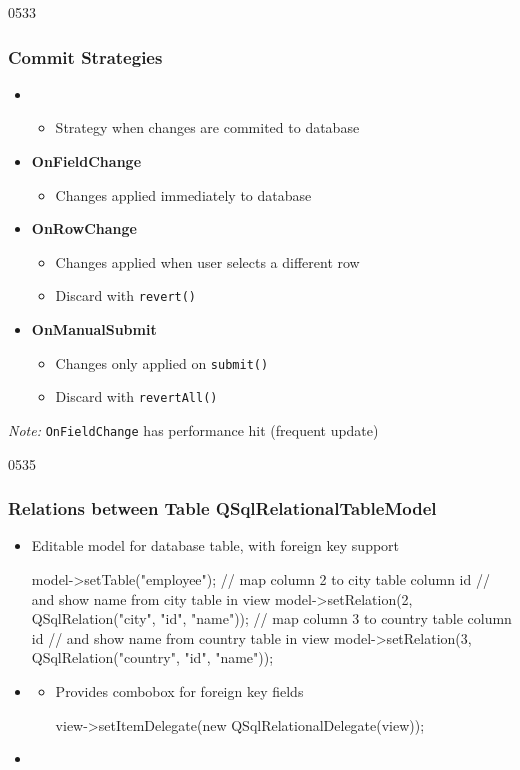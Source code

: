 \begin{slide}{0533}\frametitle{Commit Strategies}
\begin{itemize}
\item {}
  \begin{itemize}
  \item Strategy when changes are commited to database
  \end{itemize}
\medskip
\item \textbf{OnFieldChange}
  \begin{itemize}
  \item Changes applied immediately to database
  \end{itemize}
\item \textbf{OnRowChange}
  \begin{itemize}
  \item Changes applied when user selects a different row
  \item Discard with \texttt{revert()}
  \end{itemize}
\item \textbf{OnManualSubmit}
  \begin{itemize}
  \item Changes only applied on \texttt{submit()}
  \item Discard with \texttt{revertAll()}
  \end{itemize}
\end{itemize}
\medskip
\begin{footnotesize}
\emph{Note:} \texttt{OnFieldChange} has performance hit (frequent update)
\end{footnotesize}
\end{slide}

\begin{slide}[fragile]{0535}\frametitle{Relations between Table QSqlRelationalTableModel}
\begin{itemize}
\item Editable model for database table, with foreign key support
  \begin{cpp}
model->setTable("employee");
// map column 2 to city table column id
// and show name from city table in view
model->setRelation(2, QSqlRelation("city", "id", "name"));
// map column 3 to country table column id 
// and show name from country table in view
model->setRelation(3, QSqlRelation("country", "id", "name"));    
  \end{cpp}
\medskip
\item \textbf{}
  \begin{itemize}
  \item Provides combobox for foreign key fields
    \begin{cpp}
view->setItemDelegate(new QSqlRelationalDelegate(view));
    \end{cpp}
  \end{itemize}

\item {}
\end{itemize}
\end{slide}

